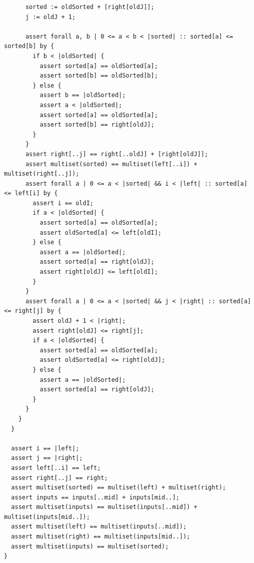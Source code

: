 \documentclass{article}
\begin{document}
\begin{lstlisting}
      sorted := oldSorted + [right[oldJ]];
      j := oldJ + 1;

      assert forall a, b | 0 <= a < b < |sorted| :: sorted[a] <= sorted[b] by {
        if b < |oldSorted| {
          assert sorted[a] == oldSorted[a];
          assert sorted[b] == oldSorted[b];
        } else {
          assert b == |oldSorted|;
          assert a < |oldSorted|;
          assert sorted[a] == oldSorted[a];
          assert sorted[b] == right[oldJ];
        }
      }
      assert right[..j] == right[..oldJ] + [right[oldJ]];
      assert multiset(sorted) == multiset(left[..i]) + multiset(right[..j]);
      assert forall a | 0 <= a < |sorted| && i < |left| :: sorted[a] <= left[i] by {
        assert i == oldI;
        if a < |oldSorted| {
          assert sorted[a] == oldSorted[a];
          assert oldSorted[a] <= left[oldI];
        } else {
          assert a == |oldSorted|;
          assert sorted[a] == right[oldJ];
          assert right[oldJ] <= left[oldI];
        }
      }
      assert forall a | 0 <= a < |sorted| && j < |right| :: sorted[a] <= right[j] by {
        assert oldJ + 1 < |right|;
        assert right[oldJ] <= right[j];
        if a < |oldSorted| {
          assert sorted[a] == oldSorted[a];
          assert oldSorted[a] <= right[oldJ];
        } else {
          assert a == |oldSorted|;
          assert sorted[a] == right[oldJ];
        }
      }
    }
  }

  assert i == |left|;
  assert j == |right|;
  assert left[..i] == left;
  assert right[..j] == right;
  assert multiset(sorted) == multiset(left) + multiset(right);
  assert inputs == inputs[..mid] + inputs[mid..];
  assert multiset(inputs) == multiset(inputs[..mid]) + multiset(inputs[mid..]);
  assert multiset(left) == multiset(inputs[..mid]);
  assert multiset(right) == multiset(inputs[mid..]);
  assert multiset(inputs) == multiset(sorted);
}
\end{lstlisting}
\end{document}

